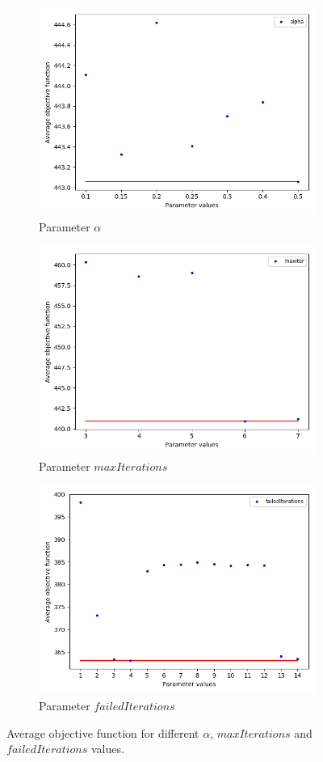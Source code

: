 \begin{figure}[h!]
\begin{subfigure}[b]{.49\linewidth}
\centering
\includegraphics[width=0.8\linewidth]{./img/best-alpha.png}
\caption{ Parameter $\alpha$}\label{fig1a}
\end{subfigure}\hfill
\begin{subfigure}[b]{.49\linewidth}
\centering
\includegraphics[width=0.8\linewidth]{./img/best-maxiter.png}
\caption{Parameter $maxIterations$ }\label{fig1b}
\end{subfigure}\vfill
\begin{subfigure}[b]{.49\linewidth}
\centering
\includegraphics[width=0.8\linewidth]{./img/best-lsiteration.png}
\caption{Parameter $failedIterations$ }\label{fig1c}
\end{subfigure}%
\caption{Average objective function for different  $\alpha$,  $maxIterations$ and   $failedIterations$ values.  }
\label{fig_grasp_params}
\end{figure}


